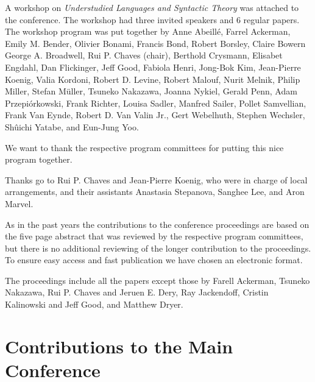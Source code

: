 \documentclass[11pt,a4paper,fleqn]{article}
\begin{document}
A workshop on \emph{Understudied Languages and Syntactic Theory}
was attached to the conference. The workshop had three invited speakers and 
6 regular papers. The workshop program was put together by Anne Abeillé,
Farrel Ackerman,
Emily M. Bender,
Olivier Bonami,
Francis Bond,
Robert Borsley,
Claire Bowern
George A. Broadwell,
Rui P. Chaves (chair),
Berthold Crysmann,
Elisabet Engdahl,
Dan Flickinger,
Jeff Good,
Fabiola Henri,
Jong-Bok Kim,
Jean-Pierre Koenig,
Valia Kordoni,
Robert D. Levine,
Robert Malouf,
Nurit Melnik,
Philip Miller,
Stefan Müller,
Tsuneko Nakazawa,
Joanna Nykiel,
Gerald Penn,
Adam Przepiórkowski,
Frank Richter,
Louisa Sadler,
Manfred Sailer,
Pollet Samvellian,
Frank Van Eynde,
Robert D. Van Valin Jr.,
Gert Webelhuth,
Stephen Wechsler,
Shûichi Yatabe, and
Eun-Jung Yoo.

We want to thank the respective program committees for putting this nice program together.

Thanks go to Rui P. Chaves and Jean-Pierre Koenig, who were
in charge of local arrangements, and their assistants Anastasia Stepanova, Sanghee Lee, and Aron Marvel.
 

As in the past years the contributions to the conference proceedings are based on the five page abstract
that was reviewed by the respective program committees, but there is no additional reviewing of the
longer contribution to the proceedings.
To ensure easy access and fast publication we have chosen an electronic format.

The proceedings include all the papers except those by Farell Ackerman, Tsu\-ne\-ko Nakazawa, Rui
P. Chaves and Jeruen E. Dery, Ray Jackendoff, Cristin Kalinowski and Jeff Good, and Matthew Dryer.



\newpage
\part{Contributions to the Main Conference}
\thispagestyle{empty}
\newpage
        \setcounter{page}{6}
\thispagestyle{empty}
\end{document}
